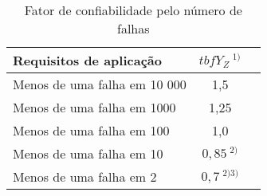 \begin{table}[]
\centering
\caption{\label{tab:x} Fator de confiabilidade pelo número de falhas}
\begin{tabular}{ l c c}
\hline
\textbf{Requisitos de aplicação}        &$ tbf{Y_Z \ ^{1)}}$ \\ \hline
Menos de uma falha em 10 000            & 1,5       \\
Menos de uma falha em 1000              & 1,25      \\
Menos de uma falha em 100               & 1,0       \\
Menos de uma falha em 10                & $0,85\ ^{2)}$   \\
Menos de uma falha em 2                 & $0,7\ ^{2) 3)}$
\end{tabular}
\end{table}